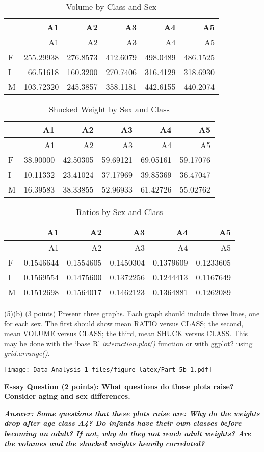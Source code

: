 \documentclass[
]{article}
\begin{document}
\begin{longtable}[]{@{}lrrrrr@{}}
\caption{Volume by Class and Sex}\tabularnewline
\toprule
& A1 & A2 & A3 & A4 & A5\tabularnewline
\midrule
\endfirsthead
\toprule
& A1 & A2 & A3 & A4 & A5\tabularnewline
\midrule
\endhead
F & 255.29938 & 276.8573 & 412.6079 & 498.0489 & 486.1525\tabularnewline
I & 66.51618 & 160.3200 & 270.7406 & 316.4129 & 318.6930\tabularnewline
M & 103.72320 & 245.3857 & 358.1181 & 442.6155 & 440.2074\tabularnewline
\bottomrule
\end{longtable}

\begin{longtable}[]{@{}lrrrrr@{}}
\caption{Shucked Weight by Sex and Class}\tabularnewline
\toprule
& A1 & A2 & A3 & A4 & A5\tabularnewline
\midrule
\endfirsthead
\toprule
& A1 & A2 & A3 & A4 & A5\tabularnewline
\midrule
\endhead
F & 38.90000 & 42.50305 & 59.69121 & 69.05161 & 59.17076\tabularnewline
I & 10.11332 & 23.41024 & 37.17969 & 39.85369 & 36.47047\tabularnewline
M & 16.39583 & 38.33855 & 52.96933 & 61.42726 & 55.02762\tabularnewline
\bottomrule
\end{longtable}

\begin{longtable}[]{@{}lrrrrr@{}}
\caption{Ratios by Sex and Class}\tabularnewline
\toprule
& A1 & A2 & A3 & A4 & A5\tabularnewline
\midrule
\endfirsthead
\toprule
& A1 & A2 & A3 & A4 & A5\tabularnewline
\midrule
\endhead
F & 0.1546644 & 0.1554605 & 0.1450304 & 0.1379609 &
0.1233605\tabularnewline
I & 0.1569554 & 0.1475600 & 0.1372256 & 0.1244413 &
0.1167649\tabularnewline
M & 0.1512698 & 0.1564017 & 0.1462123 & 0.1364881 &
0.1262089\tabularnewline
\bottomrule
\end{longtable}

(5)(b) (3 points) Present three graphs. Each graph should include three
lines, one for each sex. The first should show mean RATIO versus CLASS;
the second, mean VOLUME versus CLASS; the third, mean SHUCK versus
CLASS. This may be done with the `base R' \emph{interaction.plot()}
function or with ggplot2 using \emph{grid.arrange()}.

\texttt{[image: Data\_Analysis\_1\_files/figure-latex/Part\_5b-1.pdf]}

\textbf{Essay Question (2 points): What questions do these plots raise?
Consider aging and sex differences.}

\textbf{\emph{Answer: Some questions that these plots raise are: Why do
the weights drop after age class A4? Do infants have their own classes
before becoming an adult? If not, why do they not reach adult weights?
Are the volumes and the shucked weights heavily correlated? }}
\end{document}
